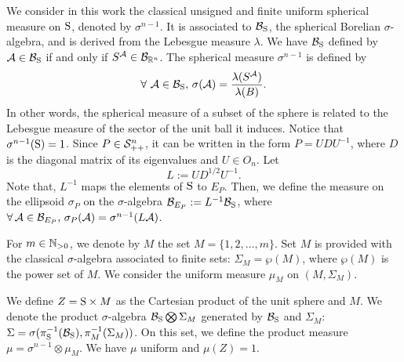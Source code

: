 We consider in this work the classical unsigned and finite uniform spherical measure on $\text{S}$, denoted by $\sigma^{n-1}$. It is associated to $\mathcal{B}_{\text{S}}$, the spherical Borelian $\sigma$-algebra, and is derived from the Lebesgue measure $\lambda$. We have $\mathcal{B}_{\text{S}}$ defined by $\mathcal{A} \in \mathcal{B}_{\text{S}}$ if and only if $S^{\mathcal{A}} \in \mathcal{B}_{\mathbb{R}^n}$. The spherical measure $\sigma^{n-1}$ is defined by
$$\forall\ \mathcal{A} \in \mathcal{B}_{\text{S}},\, \sigma(\mathcal{A}) = \frac{\lambda(S^{\mathcal{A}})}{\lambda(B)}. $$
In other words, the spherical measure of a subset of the sphere is related to the Lebesgue measure of the sector of the unit ball it induces. Notice that $\sigma^{n-1}(\text{S}) = 1$.
Since $P \in \mathcal{S}_{++}^n$, it can be written in the form $P = UDU^{-1}$, where $D$ is the diagonal matrix of its eigenvalues and $U \in O_n$. Let \begin{equation}\label{choleski}L:=UD^{1/2}U^{-1}.\end{equation} Note that, $L^{-1}$ maps the elements of $\text{S}$ to $E_P$.  Then, we define the measure on the ellipsoid $\sigma_P$ on the $\sigma$-algebra $\mathcal{B}_{E_P}:=L^{-1}\mathcal{B}_{\text{S}}$, where $\forall\, \mathcal{A} \in \mathcal{B}_{E_P},\, \sigma_P({\mathcal{A}}) = \sigma^{n-1}(L\mathcal{A})$. 

%
%
%


For $m \in \mathbb{N}_{>0}$, we denote by $M$ the set $M=\{1,2, \ldots,m \}$. Set $M$ is provided with the classical $\sigma$-algebra associated to finite sets: $\Sigma_M = \wp(M)$, where $\wp(M)$ is the power set of $M$. We consider the uniform measure $\mu_M$ on $(M, \Sigma_M)$. 

We define $Z = \text{S} \times M$ as the Cartesian product of the unit sphere and $M$. We denote the product $\sigma$-algebra $\mathcal{B}_{\text{S}} \bigotimes \Sigma_M$ generated by $\mathcal{B}_{\text{S}}$ and $\Sigma_M$: $\Sigma = \sigma( \pi_{\text{S}}^{-1}(\mathcal{B}_{\text{S}}),  \pi_{M}^{-1}(\Sigma_M))$. On this set, we define the product measure $\mu = \sigma^{n-1} \otimes \mu_M$. We have $\mu$ uniform and $\mu(Z)=1$.  